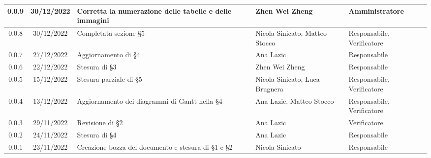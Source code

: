 \begin{center}
\begin{tabularx}{\textwidth}{| c | c | X | X | X |}
		\hline
		0.0.9 & 30/12/2022 & Corretta la numerazione delle tabelle e delle immagini & Zhen Wei Zheng & Amministratore\\
		\hline
		0.0.8 & 30/12/2022 & Completata sezione §5 & Nicola Sinicato, Matteo Stocco & Responsabile, Verificatore\\
		\hline
		0.0.7 & 27/12/2022 & Aggiornamento di §4 & Ana Lazic & 	Responsabile\\
		\hline
		0.0.6 & 22/12/2022 & Stesura di §3 & Zhen Wei Zheng & Responsabile\\
		\hline
		0.0.5 & 15/12/2022 & Stesura parziale di §5 & Nicola Sinicato, Luca Brugnera & Responsabile, Verificatore\\
		\hline
		0.0.4 & 13/12/2022 & Aggiornamento dei diagrammi di Gantt nella §4 & Ana Lazic, Matteo Stocco & Responsabile, Verificatore\\
		\hline
		0.0.3 & 29/11/2022 & Revisione di §2 & Ana Lazic & Verificatore\\
		\hline
		0.0.2 & 24/11/2022 & Stesura di §4 & Ana Lazic & Responsabile\\
		\hline
		0.0.1 & 23/11/2022 & Creazione bozza del documento e stesura di §1 e §2 & Nicola Sinicato & Responsabile\\
		\hline
	\end{tabularx}
\end{center}
	
	

